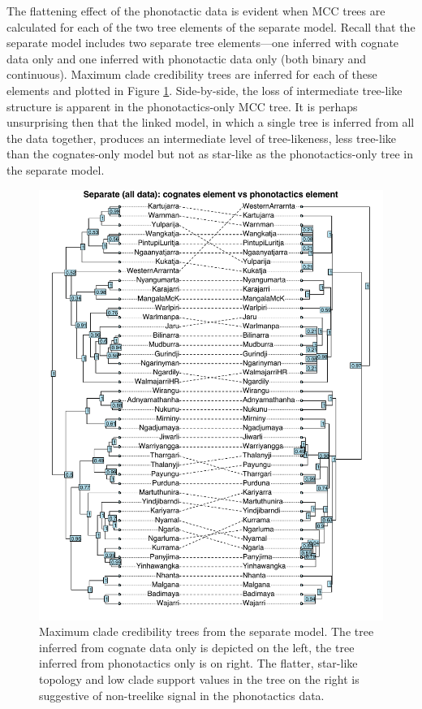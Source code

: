 \documentclass[]{article}
\begin{document}
The flattening effect of the phonotactic data is evident when MCC trees are calculated for each of the two tree elements of the separate model. Recall that the separate model includes two separate tree elements---one inferred with cognate data only and one inferred with phonotactic data only (both binary and continuous). Maximum clade credibility trees are inferred for each of these elements and plotted in Figure \ref{fig:separate-cogs-vs-phonotactics-all}. Side-by-side, the loss of intermediate tree-like structure is apparent in the phonotactics-only MCC tree. It is perhaps unsurprising then that the linked model, in which a single tree is inferred from all the data together, produces an intermediate level of tree-likeness, less tree-like than the cognates-only model but not as star-like as the phonotactics-only tree in the separate model.

\begin{figure}
\centering
\includegraphics{fig/separate_cogs_vs_phonotactics_alldata.pdf}
\caption{\label{fig:separate-cogs-vs-phonotactics-all}Maximum clade credibility trees from the separate model. The tree inferred from cognate data only is depicted on the left, the tree inferred from phonotactics only is on right. The flatter, star-like topology and low clade support values in the tree on the right is suggestive of non-treelike signal in the phonotactics data.}
\end{figure}
\end{document}
